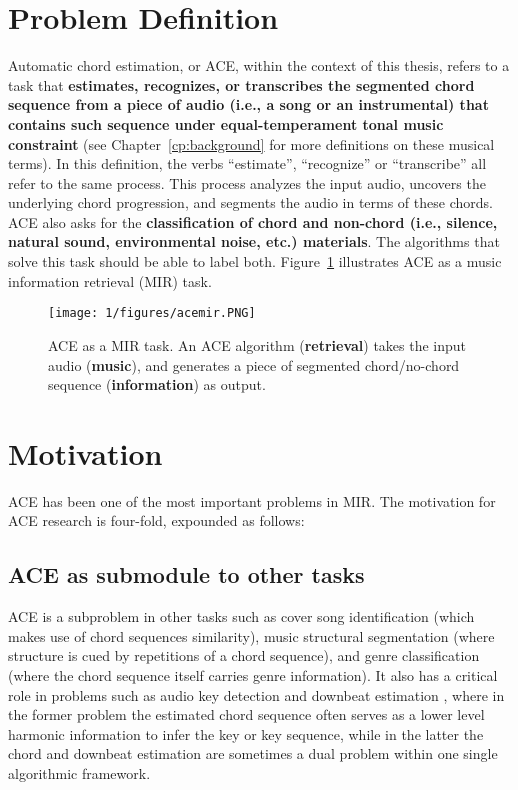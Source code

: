 \section{Problem Definition} \label{sec:1-problemdef}
Automatic chord estimation, or ACE, within the context of this thesis, refers to a task that \textbf{estimates, recognizes, or transcribes the segmented chord sequence from a piece of audio (i.e., a song or an instrumental) that contains such sequence under equal-temperament tonal music constraint} (see Chapter~\ref{cp:background} for more definitions on these musical terms). In this definition, the verbs ``estimate'', ``recognize'' or ``transcribe'' all refer to the same process. This process analyzes the input audio, uncovers the underlying chord progression, and segments the audio in terms of these chords. ACE also asks for the \textbf{classification of chord and non-chord (i.e., silence, natural sound, environmental noise, etc.) materials}. The algorithms that solve this task should be able to label both. Figure~\ref{fig:1-acemir} illustrates ACE as a music information retrieval (MIR) task.
\begin{figure}[h]
\centering
\texttt{[image: 1/figures/acemir.PNG]}
\caption{ACE as a MIR task. An ACE algorithm (\textbf{retrieval}) takes the input audio (\textbf{music}), and generates a piece of segmented chord/no-chord sequence (\textbf{information}) as output.}
\label{fig:1-acemir}
\end{figure}

\section{Motivation} \label{sec:1-moti}
ACE has been one of the most important problems in MIR. The motivation for ACE research is four-fold, expounded as follows:

\subsection{ACE as submodule to other tasks}
ACE is a subproblem in other tasks such as cover song identification \cite{bello2007audio,lee2006identifying,serra2010audio} (which makes use of chord sequences similarity), music structural segmentation \cite{bello2005robust} (where structure is cued by repetitions of a chord sequence), and genre classification \cite{cheng2008automatic,perez2009genre} (where the chord sequence itself carries genre information). It also has a critical role in problems such as audio key detection \cite{papadopoulos2012modeling,pauwels2010integrating} and downbeat estimation \cite{papadopoulos2008simultaneous,mauch2010simultaneous}, where in the former problem the estimated chord sequence often serves as a lower level harmonic information to infer the key or key sequence, while in the latter the chord and downbeat estimation are sometimes a dual problem within one single algorithmic framework.

